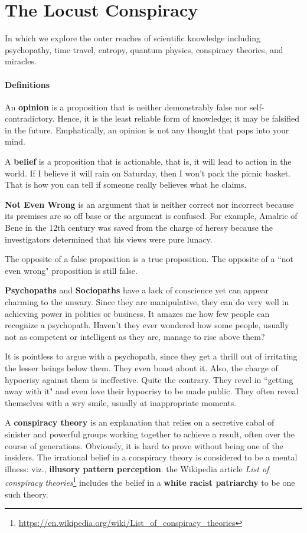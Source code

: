 \section{The Locust Conspiracy}

In which we explore the outer reaches of scientific knowledge including psychopathy, time travel, entropy, quantum physics, conspiracy theories, and miracles.

\paragraph{Definitions}
An \textbf{opinion} is a proposition that is neither demonstrably false nor self-contradictory. Hence, it is the least reliable form of knowledge; it may be falsified in the future. Emphatically, an opinion is not any thought that pops into your mind.

A \textbf{belief} is a proposition that is actionable, that is, it will lead to action in the world. If I believe it will rain on Saturday, then I won't pack the picnic basket. That is how you can tell if someone really believes what he claims.

\textbf{Not Even Wrong} is an argument that is neither correct nor incorrect because its premises are so off base or the argument is confused. For example, Amalric of Bene in the 12th century was saved from the charge of heresy because the investigators determined that his views were pure lunacy.

The opposite of a false proposition is a true proposition. The opposite of a ``not even wrong" proposition is still false.

\textbf{Psychopaths} and \textbf{Sociopaths} have a lack of conscience yet can appear charming to the unwary. Since they are manipulative, they can do very well in achieving power in politics or business. It amazes me how few people can recognize a psychopath. Haven't they ever wondered how some people, usually not as competent or intelligent as they are, manage to rise above them?

It is pointless to argue with a psychopath, since they get a thrill out of irritating the lesser beings below them. They even boast about it. Also, the charge of hypocrisy against them is ineffective. Quite the contrary. They revel in ``getting away with it" and even love their hypocrisy to be made public. They often reveal themselves with a wry smile, usually at inappropriate moments.

A \textbf{conspiracy theory} is an explanation that relies on a secretive cabal of sinister and powerful groups working together to achieve a result, often over the course of generations. Obviously, it is hard to prove without being one of the insiders. The irrational belief in a conspiracy theory is considered to be a mental illness: viz., \textbf{illusory pattern perception}. the Wikipedia article \textit{List of conspiracy theories}\footnote{\url{https://en.wikipedia.org/wiki/List_of_conspiracy_theories}} includes the belief in a \textbf{white racist patriarchy} to be one such theory.

